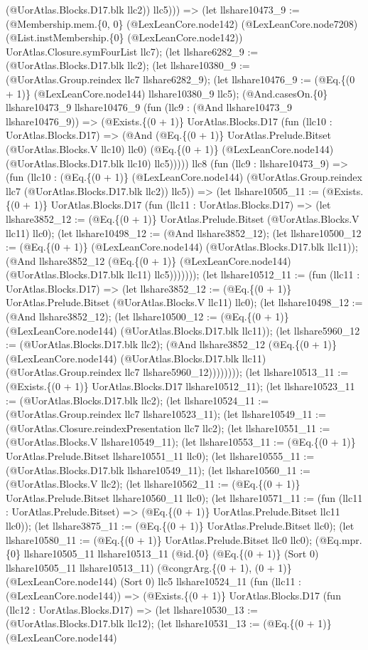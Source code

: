 \documentclass[11pt]{article}
\begin{document}
(@UorAtlas.Blocks.D17.blk llc2)) llc5))) => (let llshare10473\_9 := (@Membership.mem.\{0, 0\} (@LexLeanCore.node142) (@LexLeanCore.node7208) (@List.instMembership.\{0\} (@LexLeanCore.node142)) UorAtlas.Closure.symFourList llc7); (let llshare6282\_9 := (@UorAtlas.Blocks.D17.blk llc2); (let llshare10380\_9 := (@UorAtlas.Group.reindex llc7 llshare6282\_9); (let llshare10476\_9 := (@Eq.\{(0 + 1)\} (@LexLeanCore.node144) llshare10380\_9 llc5); (@And.casesOn.\{0\} llshare10473\_9 llshare10476\_9 (fun (llc9 : (@And llshare10473\_9 llshare10476\_9)) => (@Exists.\{(0 + 1)\} UorAtlas.Blocks.D17 (fun (llc10 : UorAtlas.Blocks.D17) => (@And (@Eq.\{(0 + 1)\} UorAtlas.Prelude.Bitset (@UorAtlas.Blocks.V llc10) llc0) (@Eq.\{(0 + 1)\} (@LexLeanCore.node144) (@UorAtlas.Blocks.D17.blk llc10) llc5))))) llc8 (fun (llc9 : llshare10473\_9) => (fun (llc10 : (@Eq.\{(0 + 1)\} (@LexLeanCore.node144) (@UorAtlas.Group.reindex llc7 (@UorAtlas.Blocks.D17.blk llc2)) llc5)) => (let llshare10505\_11 := (@Exists.\{(0 + 1)\} UorAtlas.Blocks.D17 (fun (llc11 : UorAtlas.Blocks.D17) => (let llshare3852\_12 := (@Eq.\{(0 + 1)\} UorAtlas.Prelude.Bitset (@UorAtlas.Blocks.V llc11) llc0); (let llshare10498\_12 := (@And llshare3852\_12); (let llshare10500\_12 := (@Eq.\{(0 + 1)\} (@LexLeanCore.node144) (@UorAtlas.Blocks.D17.blk llc11)); (@And llshare3852\_12 (@Eq.\{(0 + 1)\} (@LexLeanCore.node144) (@UorAtlas.Blocks.D17.blk llc11) llc5))))))); (let llshare10512\_11 := (fun (llc11 : UorAtlas.Blocks.D17) => (let llshare3852\_12 := (@Eq.\{(0 + 1)\} UorAtlas.Prelude.Bitset (@UorAtlas.Blocks.V llc11) llc0); (let llshare10498\_12 := (@And llshare3852\_12); (let llshare10500\_12 := (@Eq.\{(0 + 1)\} (@LexLeanCore.node144) (@UorAtlas.Blocks.D17.blk llc11)); (let llshare5960\_12 := (@UorAtlas.Blocks.D17.blk llc2); (@And llshare3852\_12 (@Eq.\{(0 + 1)\} (@LexLeanCore.node144) (@UorAtlas.Blocks.D17.blk llc11) (@UorAtlas.Group.reindex llc7 llshare5960\_12)))))))); (let llshare10513\_11 := (@Exists.\{(0 + 1)\} UorAtlas.Blocks.D17 llshare10512\_11); (let llshare10523\_11 := (@UorAtlas.Blocks.D17.blk llc2); (let llshare10524\_11 := (@UorAtlas.Group.reindex llc7 llshare10523\_11); (let llshare10549\_11 := (@UorAtlas.Closure.reindexPresentation llc7 llc2); (let llshare10551\_11 := (@UorAtlas.Blocks.V llshare10549\_11); (let llshare10553\_11 := (@Eq.\{(0 + 1)\} UorAtlas.Prelude.Bitset llshare10551\_11 llc0); (let llshare10555\_11 := (@UorAtlas.Blocks.D17.blk llshare10549\_11); (let llshare10560\_11 := (@UorAtlas.Blocks.V llc2); (let llshare10562\_11 := (@Eq.\{(0 + 1)\} UorAtlas.Prelude.Bitset llshare10560\_11 llc0); (let llshare10571\_11 := (fun (llc11 : UorAtlas.Prelude.Bitset) => (@Eq.\{(0 + 1)\} UorAtlas.Prelude.Bitset llc11 llc0)); (let llshare3875\_11 := (@Eq.\{(0 + 1)\} UorAtlas.Prelude.Bitset llc0); (let llshare10580\_11 := (@Eq.\{(0 + 1)\} UorAtlas.Prelude.Bitset llc0 llc0); (@Eq.mpr.\{0\} llshare10505\_11 llshare10513\_11 (@id.\{0\} (@Eq.\{(0 + 1)\} (Sort 0) llshare10505\_11 llshare10513\_11) (@congrArg.\{(0 + 1), (0 + 1)\} (@LexLeanCore.node144) (Sort 0) llc5 llshare10524\_11 (fun (llc11 : (@LexLeanCore.node144)) => (@Exists.\{(0 + 1)\} UorAtlas.Blocks.D17 (fun (llc12 : UorAtlas.Blocks.D17) => (let llshare10530\_13 := (@UorAtlas.Blocks.D17.blk llc12); (let llshare10531\_13 := (@Eq.\{(0 + 1)\} (@LexLeanCore.node144) 
\end{document}

